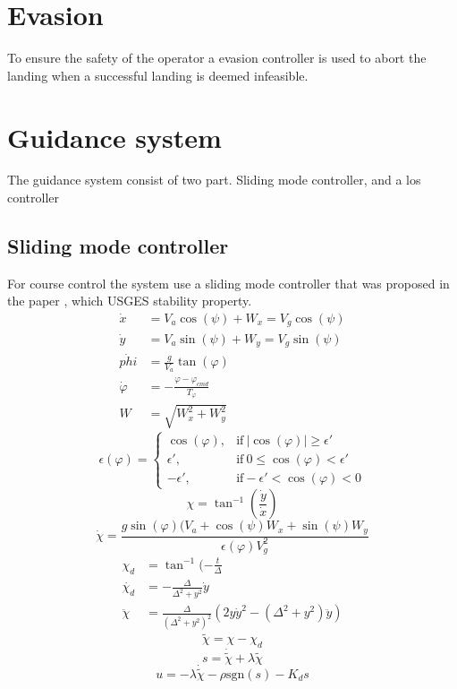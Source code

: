 \section{Evasion}
To ensure the safety of the operator a evasion controller is used to abort the landing when a successful landing is deemed infeasible.

\section{Guidance system}
The guidance system consist of two part. Sliding mode controller, and a los controller

\subsection{Sliding mode controller}
For course control the system use a sliding mode controller that was proposed in the paper \citep{fortuna2015cascaded}, which USGES stability property.
\begin{subequations}
\begin{align}
\dot{x} &= V_a\cos(\psi) + W_x = V_g\cos(\psi) \\
\dot{y} &= V_a\sin(\psi) + W_y = V_g\sin(\psi) \\
\dot{phi} &= \frac{g}{V_a}\tan(\varphi) \\
\dot{\varphi} &= -\frac{\varphi-\varphi_{cmd}}{T_\varphi} \\
W &= \sqrt{W_x^2 + W_y^2}
\end{align}
\end{subequations}
\begin{equation}
\epsilon(\varphi) = \begin{cases}
\cos(\varphi), & \text{if}\ |\cos(\varphi)|\geq\epsilon'\\
\epsilon', & \text{if}\ 0 \leq \cos(\varphi) < \epsilon' \\
-\epsilon', & \text{if} -\epsilon'<\cos(\varphi) < 0
\end{cases}
\end{equation}
\begin{equation}
\chi = \tan^{-1}(\frac{\dot{y}}{\dot{x}})
\end{equation}
\begin{equation}
\dot{\chi} = \frac{g\sin(\varphi)(V_a + \cos(\psi)W_x + \sin(\psi)W_y}{\epsilon(\varphi)V_g^2}
\end{equation}
\begin{subequations}
\begin{align}
\chi_d &= \tan^{-1}(-\frac{t}{\Delta} \\
\dot{\chi_d} &= -\frac{\Delta}{\Delta^2+y^2}\dot{y} \\
\ddot{\chi} &= \frac{\Delta}{(\Delta^2 + y^2)^2}(2y\dot{y}^2 - (\Delta^2 + y^2)\ddot{y})
\end{align}
\end{subequations}
\begin{equation}
\tilde{\chi} = \chi - \chi_d
\end{equation}
\begin{equation}
s = \dot{\tilde{\chi}} + \lambda\tilde{\chi}
\end{equation}
\begin{equation}
u = -\lambda\dot{\tilde{\chi}} - \rho\text{sgn}(s) - K_ds
\end{equation}